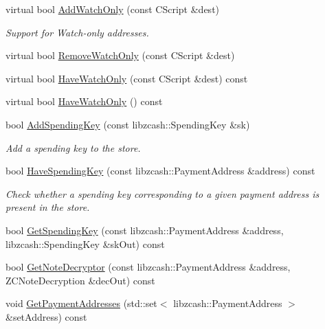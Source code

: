 \begin{DoxyCompactItemize}
\item 
virtual bool \mbox{\hyperlink{class_c_basic_key_store_a2417d0ae4e654c88cf47a1ba5f71b5a3}{Add\+Watch\+Only}} (const C\+Script \&dest)
\begin{DoxyCompactList}\small\item\em Support for Watch-\/only addresses. \end{DoxyCompactList}\item 
virtual bool \mbox{\hyperlink{class_c_basic_key_store_a20c0eccf943d6d16e24c6e2fb63fb527}{Remove\+Watch\+Only}} (const C\+Script \&dest)
\item 
virtual bool \mbox{\hyperlink{class_c_basic_key_store_a3ce143be2a1d3e752972614cf7fb7efb}{Have\+Watch\+Only}} (const C\+Script \&dest) const
\item 
virtual bool \mbox{\hyperlink{class_c_basic_key_store_aa6686d4477a180096436e7d491142f10}{Have\+Watch\+Only}} () const
\item 
bool \mbox{\hyperlink{class_c_basic_key_store_aa2d2d623fe80e75fe1718a15755ee1f1}{Add\+Spending\+Key}} (const libzcash\+::\+Spending\+Key \&sk)
\begin{DoxyCompactList}\small\item\em Add a spending key to the store. \end{DoxyCompactList}\item 
bool \mbox{\hyperlink{class_c_basic_key_store_a513367bd0a576e088e3f577686fa1ef5}{Have\+Spending\+Key}} (const libzcash\+::\+Payment\+Address \&address) const
\begin{DoxyCompactList}\small\item\em Check whether a spending key corresponding to a given payment address is present in the store. \end{DoxyCompactList}\item 
bool \mbox{\hyperlink{class_c_basic_key_store_a0c7997c0413eaa7ec76ec5bef0b40a2a}{Get\+Spending\+Key}} (const libzcash\+::\+Payment\+Address \&address, libzcash\+::\+Spending\+Key \&sk\+Out) const
\item 
bool \mbox{\hyperlink{class_c_basic_key_store_a588967be388dfc70f0449b576eea420a}{Get\+Note\+Decryptor}} (const libzcash\+::\+Payment\+Address \&address, Z\+C\+Note\+Decryption \&dec\+Out) const
\item 
void \mbox{\hyperlink{class_c_basic_key_store_af02668c3bef8b5a56231505f900a0314}{Get\+Payment\+Addresses}} (std\+::set$<$ libzcash\+::\+Payment\+Address $>$ \&set\+Address) const
\end{DoxyCompactItemize}
